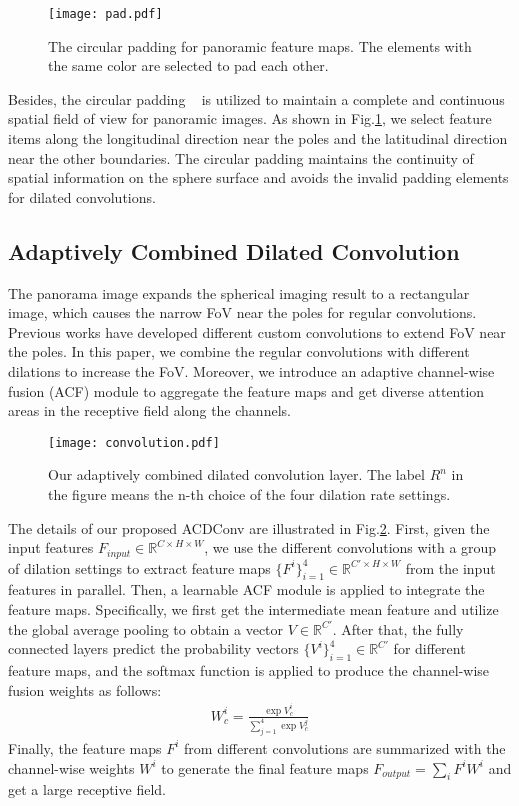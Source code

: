 \documentclass[letterpaper]{article} \usepackage{aaai21}  \usepackage{times}  \usepackage{helvet} \usepackage{courier}  \usepackage[hyphens]{url}  \usepackage{graphicx} \urlstyle{rm} \def\UrlFont{\rm}  \usepackage{natbib}  \usepackage{caption} \frenchspacing  \setlength{\pdfpagewidth}{8.5in}  \setlength{\pdfpageheight}{11in}
\newcommand{\newchange}[1]{{\color{black}#1}}
\begin{document}
\begin{figure}[tb]
\centering
  \texttt{[image: pad.pdf]}
  \caption{The circular padding for panoramic feature maps. The elements with the same color are selected to pad each other.}
  \label{fig:pad}
\end{figure}

Besides, the circular padding ~\cite{DBLP:conf/icra/WangHLHZS18} is utilized to maintain a complete and continuous spatial field of view for panoramic images. As shown in Fig.\ref{fig:pad}, we select feature items along the longitudinal direction near the poles and the latitudinal direction near the other boundaries. The circular padding maintains the continuity of spatial information on the sphere surface and avoids the invalid padding elements for dilated convolutions.

\subsection{Adaptively Combined Dilated Convolution}

The panorama image expands the spherical imaging result to a rectangular image, which causes the narrow FoV near the poles for regular convolutions. Previous works have developed different custom convolutions to extend FoV near the poles. In this paper, we combine the regular convolutions with different dilations to increase the FoV. Moreover, we introduce an adaptive channel-wise fusion (ACF) module to aggregate the feature maps and get diverse attention areas in the receptive field along the channels. 

\begin{figure}[tb]
\centering
  \texttt{[image: convolution.pdf]}
  \caption{Our adaptively combined dilated convolution layer. The label $R^n$ in the figure means the n-th choice of the four dilation rate settings.}
  \label{fig:convolution}
\end{figure}

The details of our proposed ACDConv are illustrated in Fig.\ref{fig:convolution}. First, given the input features \newchange{$F_{input}\in \mathbb{R}^{C\times H\times W}$}, we use the different convolutions with a group of dilation settings to extract feature maps \newchange{$\{F^i\}_{i=1}^4\in \mathbb{R}^{C'\times H\times W}$} from the input features in parallel. Then, a learnable ACF module is applied to integrate the feature maps. Specifically, we first get the intermediate mean feature and utilize the global average pooling to obtain a vector \newchange{$V\in \mathbb{R}^{C'}$}. \newchange{After that, the fully connected layers predict the probability vectors $\{V^i\}_{i=1}^4\in \mathbb{R}^{C'}$ for different feature maps, and the softmax function is applied to produce the channel-wise fusion weights as follows:
\begin{align}
W^i_c=\frac{\exp{V^i_c}}{\sum^4_{j=1}{\exp{V^j_c}}}
\end{align}
Finally, the feature maps $F^i$ from different convolutions are summarized with the channel-wise weights $W^i$ to generate the final feature maps $F_{output}=\sum_i{F^iW^i}$ and get a large receptive field.}
\end{document}
